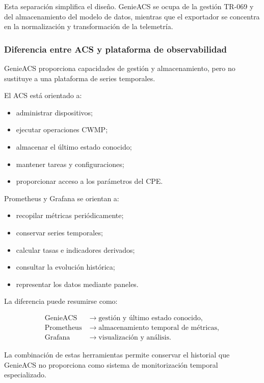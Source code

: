 Esta separación simplifica el diseño. GenieACS se ocupa de la gestión
TR-069 y del almacenamiento del modelo de datos, mientras que el
exportador se concentra en la normalización y transformación de la
telemetría.


\subsubsection*{Diferencia entre ACS y plataforma de observabilidad}

GenieACS proporciona capacidades de gestión y almacenamiento, pero no
sustituye a una plataforma de series temporales.

El ACS está orientado a:

\begin{itemize}
    \item administrar dispositivos;
    \item ejecutar operaciones CWMP;
    \item almacenar el último estado conocido;
    \item mantener tareas y configuraciones;
    \item proporcionar acceso a los parámetros del CPE.
\end{itemize}

Prometheus y Grafana se orientan a:

\begin{itemize}
    \item recopilar métricas periódicamente;
    \item conservar series temporales;
    \item calcular tasas e indicadores derivados;
    \item consultar la evolución histórica;
    \item representar los datos mediante paneles.
\end{itemize}

La diferencia puede resumirse como:

\[
\begin{aligned}
    \text{GenieACS}
    &\longrightarrow
    \text{gestión y último estado conocido},\\
    \text{Prometheus}
    &\longrightarrow
    \text{almacenamiento temporal de métricas},\\
    \text{Grafana}
    &\longrightarrow
    \text{visualización y análisis}.
\end{aligned}
\]

La combinación de estas herramientas permite conservar el historial que
GenieACS no proporciona como sistema de monitorización temporal
especializado.


